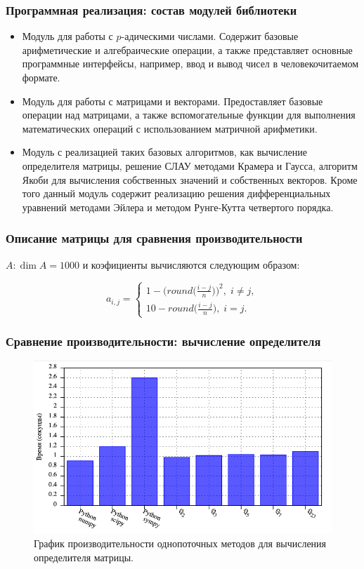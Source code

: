 \documentclass[10pt,professionalfont,utf8,presentation,compress]{beamer}
\theoremstyle{definition}
\theoremstyle{plain}
\begin{document}
\begin{frame}
\frametitle{Программная реализация: состав модулей библиотеки}
\begin{itemize}
\item Модуль для работы с $p$-адическими числами. Содержит базовые арифметические и алгебраические операции, а также представляет основные программные интерфейсы, например, ввод и вывод чисел в человекочитаемом формате.
\item Модуль для работы с матрицами и векторами. Предоставляет базовые операции над матрицами, а также вспомогательные функции для выполнения математических операций с использованием матричной арифметики.
\item Модуль с реализацией таких базовых алгоритмов, как вычисление определителя матрицы, решение СЛАУ методами Крамера и Гаусса, алгоритм Якоби для вычисления собственных значений и собственных векторов. Кроме того данный модуль содержит реализацию решения дифференциальных уравнений методами Эйлера и методом Рунге-Кутта четвертого порядка.
\end{itemize}
\end{frame}


\begin{frame}
\frametitle{Описание матрицы для сравнения производительности}

$A: \dim{A} = 1000$ и коэфициенты вычисляются следующим образом:

\begin{equation}
a_{i,j}=
\begin{cases}
1-\bigg(round\bigg(\frac{i-j}{n}\bigg)\bigg)^2, \; i \neq j, \\
10-round\bigg(\frac{i-j}{n}\bigg), \; i = j.
\end{cases}
\end{equation}
\end{frame}


\begin{frame}
\frametitle{Сравнение производительности: вычисление определителя}
\begin{figure}[H]
\centerline{\includegraphics[width=0.95\linewidth]{../gnuplot/single/det/plot.png}}
\caption{График производительности однопоточных методов для вычисления определителя матрицы.}
\label{img:single:det:1}
\end{figure}
\end{frame}
\end{document}
